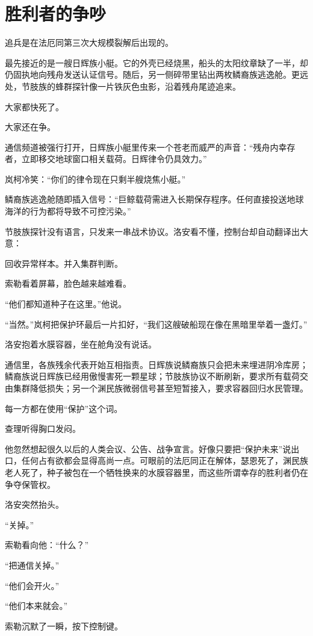 \chapter{胜利者的争吵}

追兵是在法厄同第三次大规模裂解后出现的。

最先接近的是一艘日辉族小艇。它的外壳已经烧黑，船头的太阳纹章缺了一半，却仍固执地向残舟发送认证信号。随后，另一侧碎带里钻出两枚鳞裔族逃逸舱。更远处，节肢族的蜂群探针像一片铁灰色虫影，沿着残舟尾迹追来。

大家都快死了。

大家还在争。

通信频道被强行打开，日辉族小艇里传来一个苍老而威严的声音：“残舟内幸存者，立即移交地球窗口相关载荷。日辉律令仍具效力。”

岚柯冷笑：“你们的律令现在只剩半艘烧焦小艇。”

鳞裔族逃逸舱随即插入信号：“巨鲸载荷需进入长期保存程序。任何直接投送地球海洋的行为都将导致不可控污染。”

节肢族探针没有语言，只发来一串战术协议。洛安看不懂，控制台却自动翻译出大意：

回收异常样本。并入集群判断。

索勒看着屏幕，脸色越来越难看。

“他们都知道种子在这里。”他说。

“当然。”岚柯把保护环最后一片扣好，“我们这艘破船现在像在黑暗里举着一盏灯。”

洛安抱着水膜容器，坐在舱角没有说话。

通信里，各族残余代表开始互相指责。日辉族说鳞裔族只会把未来埋进阴冷库房；鳞裔族说日辉族已经用傲慢害死一颗星球；节肢族协议不断刷新，要求所有载荷交由集群降低损失；另一个渊民族微弱信号甚至短暂接入，要求容器回归水民管理。

每一方都在使用“保护”这个词。

查理听得胸口发闷。

他忽然想起很久以后的人类会议、公告、战争宣言。好像只要把“保护未来”说出口，任何占有欲都会显得高尚一点。可眼前的法厄同正在解体，瑟恩死了，渊民族老人死了，种子被包在一个牺牲换来的水膜容器里，而这些所谓幸存的胜利者仍在争夺保管权。

洛安突然抬头。

“关掉。”

索勒看向他：“什么？”

“把通信关掉。”

“他们会开火。”

“他们本来就会。”

索勒沉默了一瞬，按下控制键。

